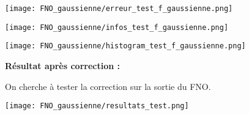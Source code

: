 \begin{minipage}{\linewidth}
	\centering
	\texttt{[image: FNO\_gaussienne/erreur\_test\_f\_gaussienne.png]}
\end{minipage}

\begin{minipage}{\linewidth}
	\centering
	\texttt{[image: FNO\_gaussienne/infos\_test\_f\_gaussienne.png]}
\end{minipage}

\begin{minipage}{\linewidth}
	\centering
	\texttt{[image: FNO\_gaussienne/histogram\_test\_f\_gaussienne.png]}
\end{minipage}

\textbf{Résultat après correction : }

On cherche à tester la correction sur la sortie du FNO. 

\begin{minipage}{\linewidth}
	\centering
	\texttt{[image: FNO\_gaussienne/resultats\_test.png]}
\end{minipage}